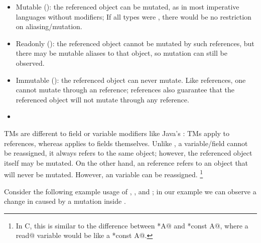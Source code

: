\begin{itemize}
\item Mutable (\Q@mut@): the referenced object can be mutated, as in most imperative languages without modifiers; 
If all types were \Q@mut@, there would be no restriction on aliasing/mutation.
\item Readonly (\Q@read@): the referenced object cannot be mutated by such references, but there may be mutable aliases to that object, so mutation can still be observed. 
\item Immutable (\Q@imm@): the referenced object can never mutate. Like \Q@read@ references, one cannot mutate through an \Q@imm@ reference; \Q@imm@ references also guarantee that the referenced object will not mutate through any reference.
\item {}
\end{itemize}
TMs are different to field or variable modifiers like Java's \Q@final@: TMs apply to references, whereas \Q@final@ applies to fields themselves. Unlike \Q@imm@, a \Q@final@ variable/field cannot be reassigned, it always refers to the same object; however, the referenced object itself may be mutated.
On the other hand, an \Q@imm@ reference refers to an object that will never be mutated. However, an \Q@imm@ variable can be reassigned. \footnote{In C, this is similar to the difference between \Q@const *A@ and \Q@*const A@, where a \Q@final read@ variable would be like a \Q@const *const A@.}



\noindent Consider the following  example usage of \Q@mut@, \Q@imm@, and \Q@read@;
 in our example we can observe a change in \Q@rp@ caused by a mutation inside \Q@mp@.

